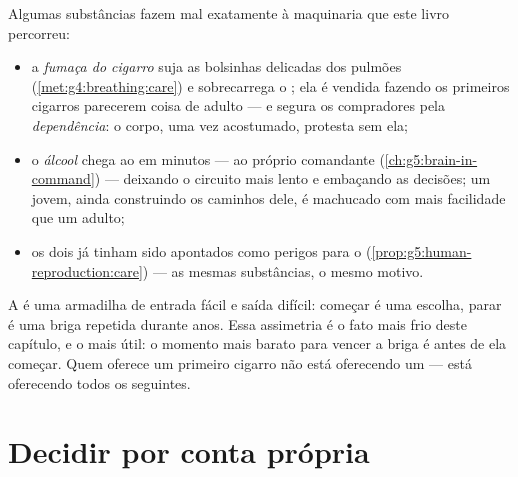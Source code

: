 \begin{proposition}\label{prop:g5:healthy-choices:substances}
Algumas substâncias fazem mal exatamente à maquinaria que este livro
percorreu:
\begin{itemize}
  \item a \emph{fumaça do cigarro} suja as bolsinhas delicadas dos
        pulmões (\cref{met:g4:breathing:care}) e sobrecarrega o
        ; ela é vendida fazendo os primeiros cigarros
        parecerem coisa de adulto --- e segura os compradores pela
        \emph{dependência}: o corpo, uma vez
        acostumado, protesta sem ela;
  \item o \emph{álcool} chega ao  em minutos --- ao próprio
        comandante (\cref{ch:g5:brain-in-command}) --- deixando o
        circuito mais lento e embaçando as decisões; um 
        jovem, ainda construindo os caminhos dele, é machucado com
        mais facilidade que um adulto;
  \item os dois já tinham sido apontados como perigos para o 
        (\cref{prop:g5:human-reproduction:care}) --- as mesmas
        substâncias, o mesmo motivo.
\end{itemize}
\end{proposition}
\admitted

\begin{remark}\label{rem:g5:healthy-choices:never}
A  é uma armadilha de entrada fácil e saída difícil:
começar é uma escolha, parar é uma briga repetida durante anos. Essa
assimetria é o fato mais frio deste capítulo, e o mais útil: o
momento mais barato para vencer a briga é antes de ela começar. Quem
oferece um primeiro cigarro não está oferecendo um --- está
oferecendo todos os seguintes.
\end{remark}

\section{Decidir por conta própria}

